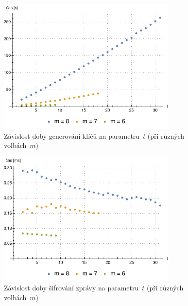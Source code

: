 \documentclass[thesis=M,czech,hidelinks]{FITthesis}[2012/06/26]
\newcommand{\0}{{\textcolor[gray]{0.75}{0}}}
\begin{document}
\begin{figure}[!ht]
    \centering
    \includegraphics[width=0.8\textwidth]{../implementace/grafy/listplot_m6-8_generovani.pdf}
    \caption[Časová složitost generování klíčů]{
        Závislost doby generování klíčů na parametru~$t$
        (při různých volbách~$m$)
    }
    \label{obr_mereni_t_gen}
\end{figure}

\begin{figure}[!ht]
    \centering
    \includegraphics[width=0.8\textwidth]{../implementace/grafy/listplot_m6-8_sifrovani.pdf}
    \caption[Časová složitost šifrování]{
        Závislost doby šifrování zprávy na parametru~$t$
        (při různých volbách~$m$)
    }
    \label{obr_mereni_t_sifr}
\end{figure}
\end{document}
